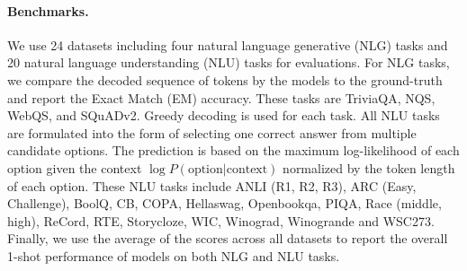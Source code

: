 \documentclass{article}
\begin{document}
\paragraph{Benchmarks.}
We use 24 datasets including four natural language generative (NLG) tasks and 20 natural language understanding (NLU) tasks for evaluations. 
For NLG tasks, we compare the decoded sequence of tokens by the models to the ground-truth and report the Exact Match (EM) accuracy. These tasks are TriviaQA, NQS, WebQS, and SQuADv2. Greedy decoding is used for each task.
All NLU tasks are formulated into the form of selecting one correct answer from multiple candidate options. The prediction is based on the maximum log-likelihood of each option given the context $\log{P(\text{option}|\text{context})}$ normalized by the token length of each option. These NLU tasks include ANLI (R1, R2, R3), ARC (Easy, Challenge), BoolQ, CB, COPA, Hellaswag, Openbookqa, PIQA, Race (middle, high), ReCord, RTE, Storycloze, WIC, Winograd, Winogrande and WSC273.
Finally, we use the average of the scores across all datasets to report the overall 1-shot performance of models on both NLG and NLU tasks. 
\end{document}
